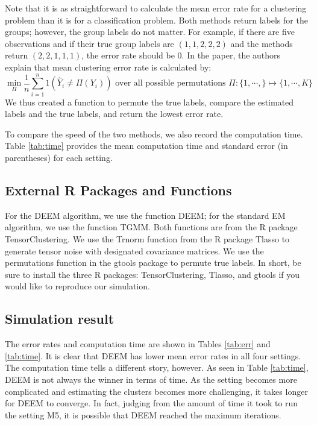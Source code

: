 \documentclass[11pt]{article}
\begin{document}
Note that it is as straightforward to calculate the mean error rate for a clustering problem than it is for a classification problem. Both methods return labels for the groups; however, the group labels do not matter. For example, if there are five observations and if their true group labels are $(1,1,2,2,2)$ and the methods return $(2,2,1,1,1)$, the error rate should be $0$. In the paper, the authors explain that mean clustering error rate is calculated by: 
\[ \min_\Pi \frac{1}{n} \sum_{i=1}^n 1 (\hat{Y}_i \ne \Pi (Y_i)) \text{ over all possible permutations } \Pi: \{1, \cdots,  \} \mapsto \{1, \cdots, K\} \]
We thus created a function to permute the true labels, compare the estimated labels and the true labels, and return the lowest error rate. 

To compare the speed of the two methods, we also record the computation time. Table \ref{tab:time} provides the mean computation time and standard error (in parentheses) for each setting. 

\subsection{External R Packages and Functions}

For the DEEM algorithm, we use the function DEEM; for the standard EM algorithm, we use the function TGMM. Both functions are from the R package TensorClustering. We use the Trnorm function from the R package Tlasso to generate tensor noise with designated covariance matrices. We use the permutations function in the gtools package to permute true labels. In short, be sure to install the three R packages: TensorClustering, Tlasso, and gtools if you would like to reproduce our simulation. 


\subsection{Simulation result}

The error rates and computation time are shown in Tables \ref{tab:err} and \ref{tab:time}. It is clear that DEEM has lower mean error rates in all four settings. The computation time tells a different story, however. As seen in Table \ref{tab:time}, DEEM is not always the winner in terms of time. As the setting becomes more complicated and estimating the clusters becomes more challenging, it takes longer for DEEM to converge. In fact, judging from the amount of time it took to run the setting M5, it is possible that DEEM reached the maximum iterations. 
\end{document}
